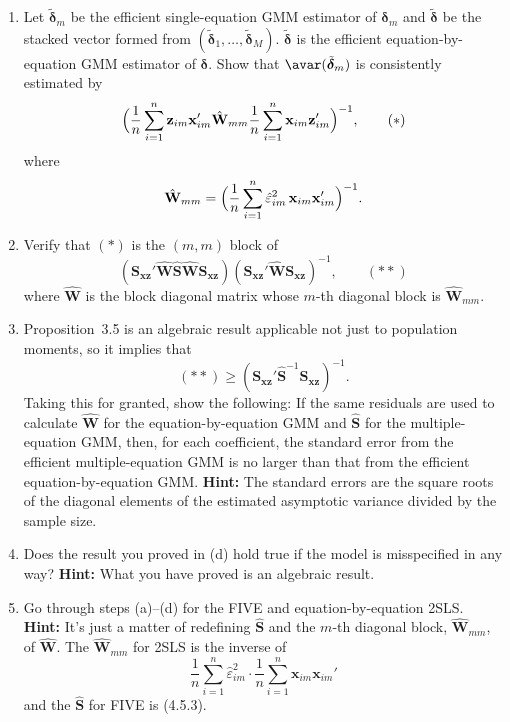\begin{problemset}
\begin{enumerate}[label=(\alph*)]
\item Let $\tilde{\boldsymbol{\delta}}_m$ be the efficient single-equation GMM estimator
of $\boldsymbol{\delta}_m$ and $\tilde{\boldsymbol{\delta}}$ be the stacked vector
formed from $(\tilde{\boldsymbol{\delta}}_1, \ldots, \tilde{\boldsymbol{\delta}}_M)$.
$\tilde{\boldsymbol{\delta}}$ is the efficient equation-by-equation GMM estimator of
$\boldsymbol{\delta}$. Show that $\avar(\tilde{\boldsymbol{\delta}}_m)$ is consistently
estimated by
\[
\Bigl(\frac{1}{n} \sum_{i=1}^{n} \mathbf{z}_{im} \mathbf{x}_{im}'
\hat{\mathbf{W}}_{mm}
\frac{1}{n} \sum_{i=1}^{n} \mathbf{x}_{im} \mathbf{z}_{im}'\Bigr)^{-1},
\qquad (*)
\]
where
\[
\hat{\mathbf{W}}_{mm} = \Bigl(\frac{1}{n} \sum_{i=1}^{n}
\hat{\varepsilon}_{im}^2\, \mathbf{x}_{im} \mathbf{x}_{im}'\Bigr)^{-1}.
\]

\item Verify that $(*)$ is the $(m, m)$ block of
\[
(\mathbf{S}_{\mathbf{xz}}' \hat{\mathbf{W}} \widehat{\mathbf{S}}
\hat{\mathbf{W}} \mathbf{S}_{\mathbf{xz}})
(\mathbf{S}_{\mathbf{xz}}' \hat{\mathbf{W}} \mathbf{S}_{\mathbf{xz}})^{-1},
\qquad (**)
\]
where $\hat{\mathbf{W}}$ is the block diagonal matrix whose $m$-th diagonal block
is $\hat{\mathbf{W}}_{mm}$.

\item Proposition~3.5 is an algebraic result applicable not just to population
moments, so it implies that
\[
(**) \geq (\mathbf{S}_{\mathbf{xz}}' \widehat{\mathbf{S}}^{-1}
\mathbf{S}_{\mathbf{xz}})^{-1}.
\]
Taking this for granted, show the following: If the same residuals are used
to calculate $\hat{\mathbf{W}}$ for the equation-by-equation GMM and
$\widehat{\mathbf{S}}$ for the multiple-equation GMM, then, for each coefficient,
the standard error from the efficient multiple-equation GMM is no larger than
that from the efficient equation-by-equation GMM.
\textbf{Hint:} The standard errors are the square roots of the diagonal elements of
the estimated asymptotic variance divided by the sample size.

\item Does the result you proved in (d) hold true if the model is misspecified in
any way? \textbf{Hint:} What you have proved is an algebraic result.

\item Go through steps (a)--(d) for the FIVE and equation-by-equation 2SLS.
\textbf{Hint:} It's just a matter of redefining $\widehat{\mathbf{S}}$ and the $m$-th
diagonal block, $\hat{\mathbf{W}}_{mm}$, of $\hat{\mathbf{W}}$.
The $\hat{\mathbf{W}}_{mm}$ for 2SLS is the inverse of
\[
\frac{1}{n} \sum_{i=1}^{n} \hat{\varepsilon}_{im}^2 \cdot
\frac{1}{n} \sum_{i=1}^{n} \mathbf{x}_{im} \mathbf{x}_{im}'
\]
and the $\widehat{\mathbf{S}}$ for FIVE is (4.5.3).
\end{enumerate}


\end{problemset}
